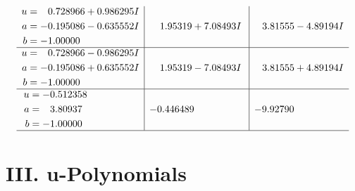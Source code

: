 \documentclass[1p]{elsarticle_modified}
\theoremstyle{definition}
\begin{document}
$$\begin{array}{c|c|c}
\begin{aligned}
u &= \phantom{-}0.728966 + 0.986295 I \\
a &= -0.195086 - 0.635552 I \\
b &= -1.00000\phantom{ +0.000000I}\end{aligned}
 & \phantom{-}1.95319 + 7.08493 I & \phantom{-}3.81555 - 4.89194 I \\ \hline\begin{aligned}
u &= \phantom{-}0.728966 - 0.986295 I \\
a &= -0.195086 + 0.635552 I \\
b &= -1.00000\phantom{ +0.000000I}\end{aligned}
 & \phantom{-}1.95319 - 7.08493 I & \phantom{-}3.81555 + 4.89194 I \\ \hline\begin{aligned}
u &= -0.512358\phantom{ +0.000000I} \\
a &= \phantom{-}3.80937\phantom{ +0.000000I} \\
b &= -1.00000\phantom{ +0.000000I}\end{aligned}
 & -0.446489\phantom{ +0.000000I} & -9.92790\phantom{ +0.000000I}\\
 \hline 
 \end{array}$$\newpage
\newpage\renewcommand{\arraystretch}{1}
\centering \section*{ III. u-Polynomials}
\end{document}
